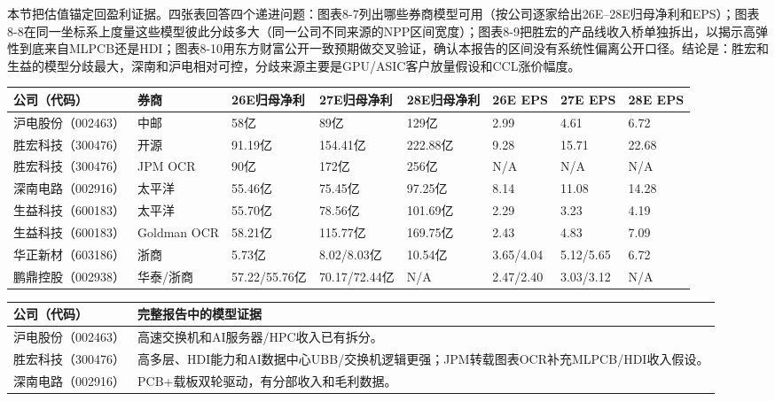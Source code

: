 本节把估值锚定回盈利证据。四张表回答四个递进问题：图表8-7列出哪些券商模型可用（按公司逐家给出26E--28E归母净利和EPS）；图表8-8在同一坐标系上度量这些模型彼此分歧多大（同一公司不同来源的NPP区间宽度）；图表8-9把胜宏的产品线收入桥单独拆出，以揭示高弹性到底来自MLPCB还是HDI；图表8-10用东方财富公开一致预期做交叉验证，确认本报告的区间没有系统性偏离公开口径。结论是：胜宏和生益的模型分歧最大，深南和沪电相对可控，分歧来源主要是GPU/ASIC客户放量假设和CCL涨价幅度。

\begin{exhibitbox}[图表8-7：已归档PDF中抽取的券商模型预测]
\footnotesize
\begin{tabularx}{\textwidth}{L{1.8cm}L{1.8cm}R{1.7cm}R{1.7cm}R{1.7cm}R{1.5cm}R{1.5cm}R{1.5cm}}
\toprule
\textbf{公司（代码）} & \textbf{券商} & \textbf{26E归母净利} & \textbf{27E归母净利} & \textbf{28E归母净利} & \textbf{26E EPS} & \textbf{27E EPS} & \textbf{28E EPS} \\
\midrule
沪电股份（002463） & 中邮 & 58亿 & 89亿 & 129亿 & 2.99 & 4.61 & 6.72 \\
胜宏科技（300476） & 开源 & 91.19亿 & 154.41亿 & 222.88亿 & 9.28 & 15.71 & 22.68 \\
胜宏科技（300476） & JPM OCR & 90亿 & 172亿 & 256亿 & N/A & N/A & N/A \\
深南电路（002916） & 太平洋 & 55.46亿 & 75.45亿 & 97.25亿 & 8.14 & 11.08 & 14.28 \\
生益科技（600183） & 太平洋 & 55.70亿 & 78.56亿 & 101.69亿 & 2.29 & 3.23 & 4.19 \\
生益科技（600183） & Goldman OCR & 58.21亿 & 115.77亿 & 169.75亿 & 2.43 & 4.83 & 7.09 \\
华正新材（603186） & 浙商 & 5.73亿 & 8.02/8.03亿 & 10.54亿 & 3.65/4.04 & 5.12/5.65 & 6.72 \\
鹏鼎控股（002938） & 华泰/浙商 & 57.22/55.76亿 & 70.17/72.44亿 & N/A & 2.47/2.40 & 3.03/3.12 & N/A \\
\bottomrule
\end{tabularx}
\vspace{0.4em}
\begin{tabularx}{\textwidth}{L{1.8cm}X}
\toprule
\textbf{公司（代码）} & \textbf{完整报告中的模型证据} \\
\midrule
沪电股份（002463） & 高速交换机和AI服务器/HPC收入已有拆分。 \\
胜宏科技（300476） & 高多层、HDI能力和AI数据中心UBB/交换机逻辑更强；JPM转载图表OCR补充MLPCB/HDI收入假设。 \\
深南电路（002916） & PCB+载板双轮驱动，有分部收入和毛利数据。 \\

\end{tabularx}
\end{exhibitbox}
